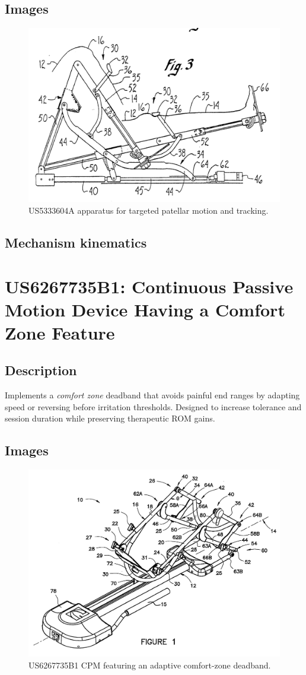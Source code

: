 \documentclass[11pt]{article}
\begin{document}
\subsection{Images}
\begin{figure}[H]
  \centering
  \includegraphics[width=0.54\linewidth]{US5333604_1.png}
  \caption{US5333604A apparatus for targeted patellar motion and tracking.}
  \label{fig:US5333604A}
\end{figure}

\subsection{Mechanism kinematics}

\section{US6267735B1: Continuous Passive Motion Device Having a Comfort Zone Feature}
\subsection{Description}
Implements a \emph{comfort zone} deadband that avoids painful end ranges by adapting speed or reversing before irritation thresholds. Designed to increase tolerance and session duration while preserving therapeutic ROM gains.
\subsection{Images}
\begin{figure}[H]
  \centering
  \includegraphics[width=0.54\linewidth]{US6267735B1_1.png}
  \caption{US6267735B1 CPM featuring an adaptive comfort-zone deadband.}
  \label{fig:US6267735B1}
\end{figure}
\end{document}
